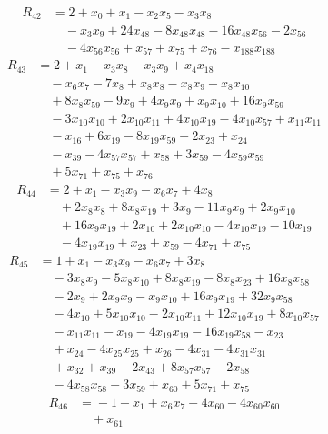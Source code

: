 \begin{align*}
R_{42}&={}2 +x_{0} +x_{1} -x_{2}x_{5} -x_{3}x_{8}\\
&\quad{}-x_{3}x_{9} +24x_{48} -8x_{48}x_{48} -16x_{48}x_{56} -2x_{56}\\
&\quad{}-4x_{56}x_{56} +x_{57} +x_{75} +x_{76} -x_{188}x_{188}
\end{align*}
\begin{align*}
R_{43}&={}2 +x_{1} -x_{3}x_{8} -x_{3}x_{9} +x_{4}x_{18}\\
&\quad{}-x_{6}x_{7} -7x_{8} +x_{8}x_{8} -x_{8}x_{9} -x_{8}x_{10}\\
&\quad{}+8x_{8}x_{59} -9x_{9} +4x_{9}x_{9} +x_{9}x_{10} +16x_{9}x_{59}\\
&\quad{}-3x_{10}x_{10} +2x_{10}x_{11} +4x_{10}x_{19} -4x_{10}x_{57} +x_{11}x_{11}\\
&\quad{}-x_{16} +6x_{19} -8x_{19}x_{59} -2x_{23} +x_{24}\\
&\quad{}-x_{39} -4x_{57}x_{57} +x_{58} +3x_{59} -4x_{59}x_{59}\\
&\quad{}+5x_{71} +x_{75} +x_{76}
\end{align*}
\begin{align*}
R_{44}&={}2 +x_{1} -x_{3}x_{9} -x_{6}x_{7} +4x_{8}\\
&\quad{}+2x_{8}x_{8} +8x_{8}x_{19} +3x_{9} -11x_{9}x_{9} +2x_{9}x_{10}\\
&\quad{}+16x_{9}x_{19} +2x_{10} +2x_{10}x_{10} -4x_{10}x_{19} -10x_{19}\\
&\quad{}-4x_{19}x_{19} +x_{23} +x_{59} -4x_{71} +x_{75}
\end{align*}
\begin{align*}
R_{45}&={}1 +x_{1} -x_{3}x_{9} -x_{6}x_{7} +3x_{8}\\
&\quad{}-3x_{8}x_{9} -5x_{8}x_{10} +8x_{8}x_{19} -8x_{8}x_{23} +16x_{8}x_{58}\\
&\quad{}-2x_{9} +2x_{9}x_{9} -x_{9}x_{10} +16x_{9}x_{19} +32x_{9}x_{58}\\
&\quad{}-4x_{10} +5x_{10}x_{10} -2x_{10}x_{11} +12x_{10}x_{19} +8x_{10}x_{57}\\
&\quad{}-x_{11}x_{11} -x_{19} -4x_{19}x_{19} -16x_{19}x_{58} -x_{23}\\
&\quad{}+x_{24} -4x_{25}x_{25} +x_{26} -4x_{31} -4x_{31}x_{31}\\
&\quad{}+x_{32} +x_{39} -2x_{43} +8x_{57}x_{57} -2x_{58}\\
&\quad{}-4x_{58}x_{58} -3x_{59} +x_{60} +5x_{71} +x_{75}
\end{align*}
\begin{align*}
R_{46}&={}-1 -x_{1} +x_{6}x_{7} -4x_{60} -4x_{60}x_{60}\\
&\quad{}+x_{61}
\end{align*}
